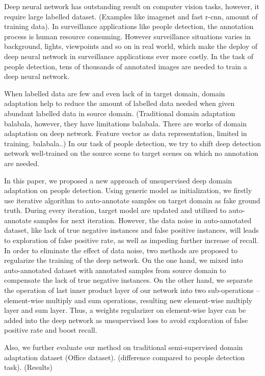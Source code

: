\documentclass[runningheads]{llncs}
\begin{document}
Deep neural network has outstanding result on computer vision tasks, however, it require large labelled dataset. (Examples like imagenet and fast r-cnn, amount of training data). In surveillance applications like people detection, the annotation process is human resource consuming. However surveillance situations varies in background, lights, viewpoints and so on in real world, which make the deploy of deep neural network in surveillance applications ever more costly. In the task of people detection, tens of thousands of annotated images are needed to train a deep neural network.
\par
When labelled data are few and even lack of in target domain, domain adaptation help to reduce the amount of labelled data needed when given abundant labelled data in source domain. (Traditional domain adaptation balabala, however, they have limitations balabala. There are works of domain adaptation on deep network. Feature vector as data representation, limited in training. balabala..) In our task of people detection, we try to shift deep detection network well-trained on the source scene to target scenes on which no annotation are needed.
\par
In this paper, we proposed a new approach of unsupervised deep domain adaptation on people detection. Using generic model as initialization, we firstly use iterative algorithm to auto-annotate samples on target domain as fake ground truth. During every iteration, target model are updated and utilized to auto-annotate samples for next iteration. However, the data noise in auto-annotated dataset, like lack of true negative instances and false positive instances, will leads to exploration of false positive rate, as well as impeding further increase of recall. In order to eliminate the effect of data noise, two methods are proposed to regularize the training of the deep network. On the one hand, we mixed into auto-annotated dataset with annotated samples from source domain to compensate the lack of true negative instances. On the other hand, we separate the operation of last inner product layer of our network into two sub-operations -- element-wise multiply and sum operations, resulting new element-wise multiply layer and sum layer. Thus, a weights regularizer on element-wise layer can be added into the deep network as unsupervised loss to avoid exploration of false positive rate and boost recall.
\par
Also, we further evaluate our method on traditional semi-supervised domain adaptation dataset (Office dataset). (difference compared to people detection task). (Results)
\end{document}
